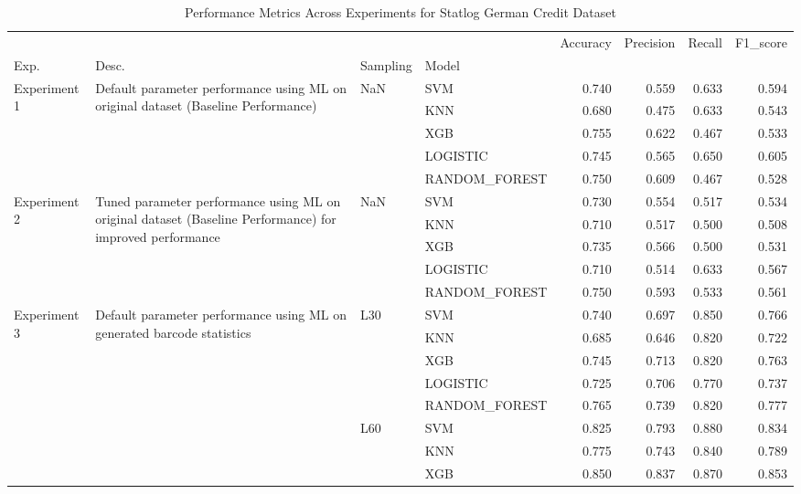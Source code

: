 \begin{table}
\caption{Performance Metrics Across Experiments for Statlog German Credit Dataset}
\label{tab:results for Statlog German Credit Dataset}
\begin{tabular}{llllrrrr}
\toprule
 &  &  &  & Accuracy & Precision & Recall & F1\_score \\
Exp. & Desc. & Sampling & Model &  &  &  &  \\
\midrule
\multirow[t]{5}{*}{Experiment 1} & \multirow[t]{5}{*}{Default parameter performance using ML on original dataset (Baseline Performance)} & \multirow[t]{5}{*}{NaN} & SVM & 0.740 & 0.559 & 0.633 & 0.594 \\
 &  &  & KNN & 0.680 & 0.475 & 0.633 & 0.543 \\
 &  &  & XGB & 0.755 & 0.622 & 0.467 & 0.533 \\
 &  &  & LOGISTIC & 0.745 & 0.565 & 0.650 & 0.605 \\
 &  &  & RANDOM\_FOREST & 0.750 & 0.609 & 0.467 & 0.528 \\
\cline{1-8} \cline{2-8} \cline{3-8}
\multirow[t]{5}{*}{Experiment 2} & \multirow[t]{5}{*}{Tuned parameter performance using ML on original dataset (Baseline Performance) for improved performance} & \multirow[t]{5}{*}{NaN} & SVM & 0.730 & 0.554 & 0.517 & 0.534 \\
 &  &  & KNN & 0.710 & 0.517 & 0.500 & 0.508 \\
 &  &  & XGB & 0.735 & 0.566 & 0.500 & 0.531 \\
 &  &  & LOGISTIC & 0.710 & 0.514 & 0.633 & 0.567 \\
 &  &  & RANDOM\_FOREST & 0.750 & 0.593 & 0.533 & 0.561 \\
\cline{1-8} \cline{2-8} \cline{3-8}
\multirow[t]{10}{*}{Experiment 3} & \multirow[t]{10}{*}{Default parameter performance using ML on generated barcode statistics} & \multirow[t]{5}{*}{L30} & SVM & 0.740 & 0.697 & 0.850 & 0.766 \\
 &  &  & KNN & 0.685 & 0.646 & 0.820 & 0.722 \\
 &  &  & XGB & 0.745 & 0.713 & 0.820 & 0.763 \\
 &  &  & LOGISTIC & 0.725 & 0.706 & 0.770 & 0.737 \\
 &  &  & RANDOM\_FOREST & 0.765 & 0.739 & 0.820 & 0.777 \\
\cline{3-8}
 &  & \multirow[t]{5}{*}{L60} & SVM & 0.825 & 0.793 & 0.880 & 0.834 \\
 &  &  & KNN & 0.775 & 0.743 & 0.840 & 0.789 \\
 &  &  & XGB & 0.850 & 0.837 & 0.870 & 0.853 \\

\end{tabular}
\end{table}
